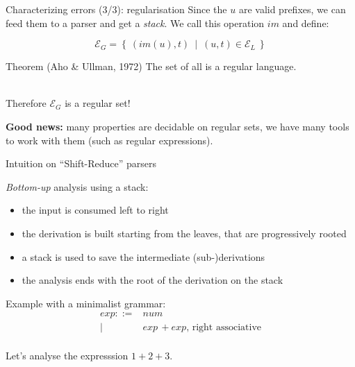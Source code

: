 \documentclass{beamer}          %
\begin{document}
\begin{frame}[t]{Characterizing errors (3/3): regularisation}
  Since the $u$ are valid prefixes, we can feed them to a parser and get a {\em stack}. We call this operation $im$ and define:

  $$
  \mathcal E_G = \left\{\ (im(u), t)\ \mid\ (u, t) \in \mathcal E_L\ \right\}
  $$

  \pause
  \begin{block}{Theorem (Aho \& Ullman, 1972)}
    The set of all  is a regular language.
  \end{block}

  \pause
  \pause

  \ \\
  Therefore $\mathcal E_G$ is a regular set!

  \textbf{Good news:} many properties are decidable on regular sets, we have
  many tools to work with them (such as regular expressions).

\end{frame}

\begin{frame}{Intuition on ``Shift-Reduce'' parsers}

  {\em Bottom-up} analysis using a stack:
  \begin{itemize}
    \item the input is consumed left to right 
    \item the derivation is built starting from the leaves,
          that are progressively rooted 
    \item a stack is used to save the intermediate (sub-)derivations
    \item the analysis ends with the root of the derivation on the stack
  \end{itemize}

  \pause
  \pause

  Example with a minimalist grammar:
  $$
  \begin{array}{rl}
    exp ::= & num \\
          | & exp\,+ exp \text{, right associative}\\
  \end{array}
  $$

  Let's analyse the expresssion $1+2+3$.
\end{frame}
\end{document}
